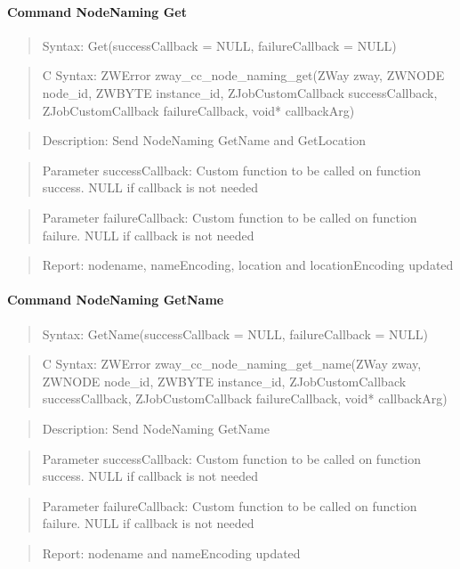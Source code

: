 \paragraph{Command NodeNaming Get}
\begin{quote}Syntax: Get(successCallback = NULL, failureCallback = NULL)\end{quote}
\begin{quote}C Syntax: ZWError zway\_cc\_node\_naming\_get(ZWay zway, ZWNODE node\_id, ZWBYTE instance\_id, ZJobCustomCallback successCallback, ZJobCustomCallback failureCallback, void* callbackArg)\end{quote}
\begin{quote}Description: Send NodeNaming GetName and GetLocation\end{quote}
\begin{quote}Parameter successCallback: Custom function to be called on function success. NULL if callback is not needed\end{quote}
\begin{quote}Parameter failureCallback: Custom function to be called on function failure. NULL if callback is not needed\end{quote}
\begin{quote}Report: nodename, nameEncoding, location and locationEncoding updated\end{quote}

\paragraph{Command NodeNaming GetName}
\begin{quote}Syntax: GetName(successCallback = NULL, failureCallback = NULL)\end{quote}
\begin{quote}C Syntax: ZWError zway\_cc\_node\_naming\_get\_name(ZWay zway, ZWNODE node\_id, ZWBYTE instance\_id, ZJobCustomCallback successCallback, ZJobCustomCallback failureCallback, void* callbackArg)\end{quote}
\begin{quote}Description: Send NodeNaming GetName\end{quote}
\begin{quote}Parameter successCallback: Custom function to be called on function success. NULL if callback is not needed\end{quote}
\begin{quote}Parameter failureCallback: Custom function to be called on function failure. NULL if callback is not needed\end{quote}
\begin{quote}Report: nodename and nameEncoding updated\end{quote}

